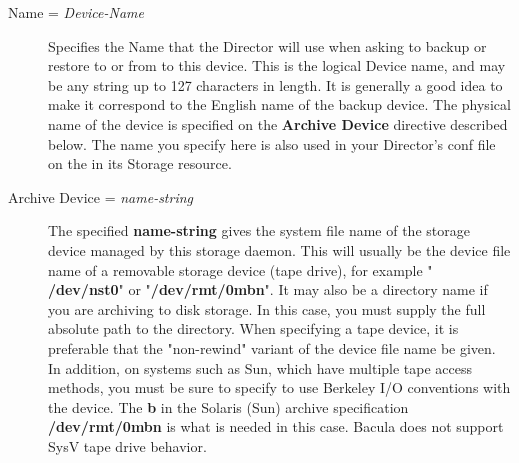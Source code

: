 \begin{description}

\item [Name = {\it Device-Name}]
   Specifies the Name that the Director will use when asking to backup or
   restore to or from to this device. This is the logical  Device name, and may
   be any string up to 127 characters in length.  It is generally a good idea to
   make it correspond to the English  name of the backup device. The physical
   name of the device is  specified on the {\bf Archive Device} directive
   described below.  The name you specify here is also used in your Director's
   conf  file on the 
     in its Storage
   resource. 

\item [Archive Device = {\it name-string}]
   The specified {\bf name-string} gives the system file name of the  storage
   device managed by this storage daemon. This will usually be  the device file
   name of a removable storage device (tape drive),  for example "{\bf
   /dev/nst0}" or "{\bf /dev/rmt/0mbn}".  It may also be a directory name
   if you are archiving to disk storage.  In this case, you must supply the
   full absolute path to the directory.  When specifying a tape device, it
   is preferable that the "non-rewind" variant of the device file name be
   given.  In addition, on systems such as Sun, which have multiple tape
   access methods, you must be sure to specify to use Berkeley I/O
   conventions with the device.  The {\bf b} in the Solaris (Sun) archive
   specification {\bf /dev/rmt/0mbn} is what is needed in this case.
   Bacula does not support SysV tape drive behavior.
   

\end{description}
